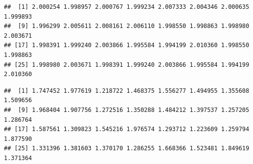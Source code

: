\documentclass[
]{krantz}
\makeatletter
\newenvironment{Shaded}{\begin{snugshade}}{\end{snugshade}}
\newcommand{\AttributeTok}[1]{\textcolor[rgb]{0.77,0.63,0.00}{#1}}
\newcommand{\CommentTok}[1]{\textcolor[rgb]{0.56,0.35,0.01}{\textit{#1}}}
\newcommand{\DecValTok}[1]{\textcolor[rgb]{0.00,0.00,0.81}{#1}}
\newcommand{\FloatTok}[1]{\textcolor[rgb]{0.00,0.00,0.81}{#1}}
\newcommand{\FunctionTok}[1]{\textcolor[rgb]{0.00,0.00,0.00}{#1}}
\newcommand{\NormalTok}[1]{#1}
\newcommand{\OtherTok}[1]{\textcolor[rgb]{0.56,0.35,0.01}{#1}}
\newcommand{\SpecialCharTok}[1]{\textcolor[rgb]{0.00,0.00,0.00}{#1}}
\newcommand{\StringTok}[1]{\textcolor[rgb]{0.31,0.60,0.02}{#1}}
\newenvironment{kframe}{%
\medskip{}
\setlength{\fboxsep}{.8em}
 \def\at@end@of@kframe{}%
 \ifinner\ifhmode%
  \def\at@end@of@kframe{\end{minipage}}%
  \begin{minipage}{\columnwidth}%
 \fi\fi%
 \def\FrameCommand##1{\hskip\@totalleftmargin \hskip-\fboxsep
 \colorbox{shadecolor}{##1}\hskip-\fboxsep
     \hskip-\linewidth \hskip-\@totalleftmargin \hskip\columnwidth}%
 \MakeFramed {\advance\hsize-\width
   \@totalleftmargin\z@ \linewidth\hsize
   \@setminipage}}%
 {\par\unskip\endMakeFramed%
 \at@end@of@kframe}
\renewenvironment{Shaded}{\begin{kframe}}{\end{kframe}}
\makeatother
\begin{document}
\begin{Shaded}
\end{Shaded}

\begin{verbatim}
##  [1] 2.000254 1.998957 2.000767 1.999234 2.007333 2.004346 2.000635 1.999893
##  [9] 1.996299 2.005611 2.008161 2.006110 1.998550 1.998863 1.998980 2.003671
## [17] 1.998391 1.999240 2.003866 1.995584 1.994199 2.010360 1.998550 1.998863
## [25] 1.998980 2.003671 1.998391 1.999240 2.003866 1.995584 1.994199 2.010360
\end{verbatim}

\begin{Shaded}
\end{Shaded}

\begin{verbatim}
##  [1] 1.747452 1.977619 1.218722 1.468375 1.556277 1.494955 1.355608 1.509656
##  [9] 1.968404 1.907756 1.272516 1.350288 1.484212 1.397537 1.257205 1.286764
## [17] 1.587561 1.309823 1.545216 1.976574 1.293712 1.223609 1.259794 1.877590
## [25] 1.331396 1.381603 1.370170 1.286255 1.668366 1.523481 1.849619 1.371364
\end{verbatim}
\end{document}
